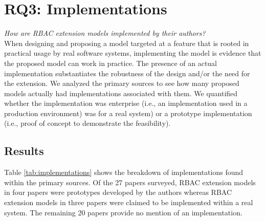 
\section{RQ3: Implementations} \label{sec:implementations}

\textit{How are RBAC extension models implemented by their authors?}
\\

When designing and proposing a model targeted at a feature that is rooted in practical
usage by real software systems, implementing the model is evidence that the
proposed model can work in practice. The presence of an actual implementation substantiates the robustness of the design and/or the need for the extension.
We analyzed the primary sources to see how many
proposed models actually had implementations associated with them.
We quantified whether the implementation was enterprise (i.e., an implementation used in a production environment) was for a real system) or a prototype implementation (i.e., proof of concept to demonstrate the feasibility).

\subsection{Results}

Table \ref{tab:implementations} shows the breakdown of implementations found within the primary sources.
Of the 27 papers surveyed, RBAC extension models in four papers were prototypes developed by the authors whereas RBAC extension models in three papers were claimed to be implemented within a real
system. The remaining 20 papers provide no
mention of an implementation.  


